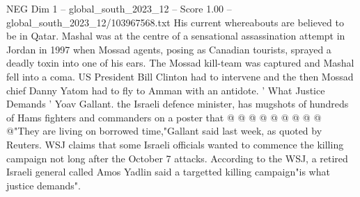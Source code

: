 \begin{textsample}{NEG Dim 1 – global\_south\_2023\_12 – Score 1.00 – global\_south\_2023\_12/103967568.txt}
His current whereabouts are believed to be in Qatar.
Mashal was at the centre of a sensational assassination attempt in Jordan in 1997 when Mossad agents, posing as Canadian tourists, sprayed a deadly toxin into one of his ears.
The Mossad kill-team was captured and Mashal fell into a coma.
US President Bill Clinton had to intervene and the then Mossad chief Danny Yatom had to fly to Amman with an antidote. ' What Justice Demands ' Yoav Gallant. the Israeli defence minister, has mugshots of hundreds of Hams fighters and commanders on a poster that @ @ @ @ @ @ @ @ @ @"They are living on borrowed time,"Gallant said last week, as quoted by Reuters.
WSJ claims that some Israeli officials wanted to commence the killing campaign not long after the October 7 attacks.
According to the WSJ, a retired Israeli general called Amos Yadlin said a targetted killing campaign"is what justice demands".

\end{textsample}

